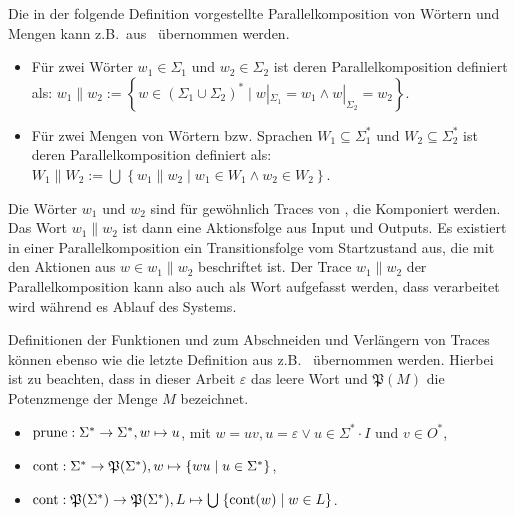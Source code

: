 Die in der folgende Definition vorgestellte Parallelkomposition von Wörtern und
Mengen kann z.B.\ aus~\cite{Vogler2014EIO} übernommen werden.

\begin{Def}\mbox{}
  \begin{itemize}
    \item Für zwei Wörter $w_1\in\Sigma _1$ und $w_2\in\Sigma _2$ ist
      deren Parallelkomposition definiert als: $w_1\| w_2:=\left\{w\in
      (\Sigma _1\cup\Sigma _2)^*\mid w|_{\Sigma _1}=w_1\wedge w|_{\Sigma
    _2}=w_2\right\}$.
    \item Für zwei Mengen von Wörtern bzw. Sprachen $W_1\subseteq \Sigma
      ^*_1$ und $W_2\subseteq \Sigma ^*_2$ ist deren Parallelkomposition
      definiert als: $W_1\| W_2:=\bigcup\hspace{1pt}\left\{w_1\| w_2\mid
      w_1\in W_1\wedge w_2\in W_2\right\}$.
  \end{itemize}
\end{Def}

Die Wörter $w_1$ und $w_2$ sind für gewöhnlich Traces von \MEIO{}, die
Komponiert werden. Das Wort $w_1\|w_2$ ist dann eine Aktionsfolge aus Input und
Outputs. Es existiert in einer Parallelkomposition ein Transitionsfolge vom
Startzustand aus, die mit den Aktionen aus $w\in w_1\|w_2$ beschriftet ist. Der
Trace $w_1\|w_2$ der Parallelkomposition kann also auch als Wort aufgefasst
werden, dass verarbeitet wird während es Ablauf des Systems.

Definitionen der Funktionen \prune{} und \cont{} zum Abschneiden und Verlängern
von Traces können ebenso wie die letzte Definition aus
z.B.~\cite{Vogler2014EIO} übernommen werden. Hierbei ist zu beachten, dass in
dieser Arbeit $\varepsilon$ das leere Wort und $\mathfrak{P}(M)$ die
Potenzmenge der Menge $M$ bezeichnet.

\begin{Def}\mbox{}
  \begin{itemize}
    \item $\mathrm{prune}{}:\Sigma ^*\rightarrow\Sigma ^*, w\mapsto u$, mit $w=uv,
      u=\varepsilon\vee u\in\Sigma ^*\cdot I$ und $v\in O^*$,
    \item $\mathrm{cont}{}:\Sigma ^*\rightarrow\mathfrak{P}(\Sigma ^*),
      w\mapsto\left\{wu\mid u\in\Sigma ^*\right\}$,
    \item $\mathrm{cont}{}:\mathfrak{P}(\Sigma ^*)\rightarrow\mathfrak{P}(\Sigma ^*),
      L\mapsto\bigcup\hspace{1pt}\left\{\mathrm{cont}{}(w)\mid w\in L\right\}$.
  \end{itemize}
\end{Def}

